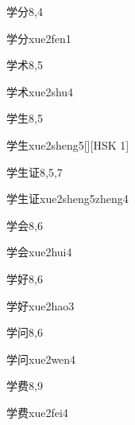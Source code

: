 \begin{entry}{学分}{8,4}
  \begin{phonetics}{学分}{xue2fen1}
  \end{phonetics}
\end{entry}

\begin{entry}{学术}{8,5}
  \begin{phonetics}{学术}{xue2shu4}
  \end{phonetics}
\end{entry}

\begin{entry}{学生}{8,5}
  \begin{phonetics}{学生}{xue2sheng5}[][HSK 1]
  \end{phonetics}
\end{entry}

\begin{entry}{学生证}{8,5,7}
  \begin{phonetics}{学生证}{xue2sheng5zheng4}
  \end{phonetics}
\end{entry}

\begin{entry}{学会}{8,6}
  \begin{phonetics}{学会}{xue2hui4}
  \end{phonetics}
\end{entry}

\begin{entry}{学好}{8,6}
  \begin{phonetics}{学好}{xue2hao3}
  \end{phonetics}
\end{entry}

\begin{entry}{学问}{8,6}
  \begin{phonetics}{学问}{xue2wen4}
  \end{phonetics}
\end{entry}

\begin{entry}{学费}{8,9}
  \begin{phonetics}{学费}{xue2fei4}
  \end{phonetics}
\end{entry}

